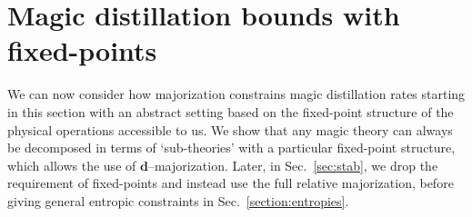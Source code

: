\documentclass[pra,
aps,
twocolumn,
superscriptaddress,
groupedaddress,
nofootinbib,
reprint
]{revtex4-1}
\begin{document}
\section{Magic distillation bounds with fixed-points}
\label{sec:frag}

We can now consider how majorization constrains magic distillation rates starting in this section with an abstract setting based on the fixed-point structure of the physical operations accessible to us. We show that any magic theory can always be decomposed in terms of `sub-theories' with a particular fixed-point structure, which allows the use of $\mathbf{d}$--majorization. Later, in Sec.~\ref{sec:stab}, we drop the requirement of fixed-points and instead use the full relative majorization, before giving general entropic constraints in Sec.~\ref{section:entropies}.
 
\end{document}

